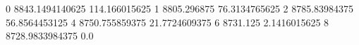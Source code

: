 0 8843.1494140625 114.166015625
1 8805.296875 76.3134765625
2 8785.83984375 56.8564453125
4 8750.755859375 21.7724609375
6 8731.125 2.1416015625
8 8728.9833984375 0.0
